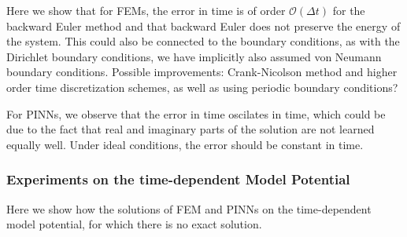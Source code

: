\documentclass{article}
\theoremstyle{definition}
\theoremstyle{plain}
\theoremstyle{remark}
\begin{document}
Here we show that for FEMs, the error in time is of order $\mathcal{O}(\Delta t)$ for the backward Euler method and that backward Euler does not preserve the energy of the system. This could also be connected to the boundary conditions, as with the Dirichlet boundary conditions, we have implicitly also assumed von Neumann boundary conditions. Possible improvements: Crank-Nicolson method and higher order time discretization schemes, as well as using periodic boundary conditions?

For PINNs, we observe that the error in time oscilates in time, which could be due to the fact that real and imaginary parts of the solution are not learned equally well. Under ideal conditions, the error should be constant in time.

\subsubsection*{Experiments on the time-dependent Model Potential}

Here we show how the solutions of FEM and PINNs on the time-dependent model potential, for which there is no exact solution. 
\end{document}
